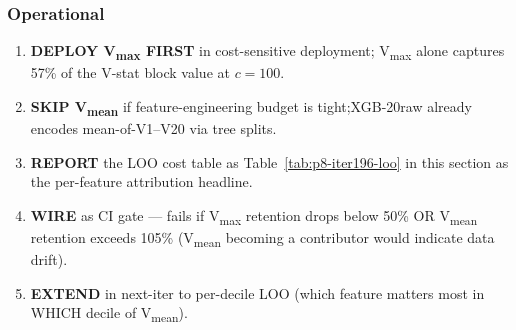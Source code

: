 \subsubsection{Operational}\label{sec:p8-iter196-operational}
\begin{enumerate}
\item \textbf{DEPLOY V\textsubscript{max} FIRST} in cost-sensitive deployment;
  V\textsubscript{max} alone captures 57\% of the V-stat block value at $c{=}100$.
\item \textbf{SKIP V\textsubscript{mean}} if feature-engineering budget is
  tight;XGB-20raw already encodes mean-of-V1--V20 via tree splits.
\item \textbf{REPORT} the LOO cost table as Table~\ref{tab:p8-iter196-loo}
  in this section as the per-feature attribution headline.
\item \textbf{WIRE} as CI gate --- fails if V\textsubscript{max} retention
  drops below 50\% OR V\textsubscript{mean} retention exceeds 105\%
  (V\textsubscript{mean} becoming a contributor would indicate data drift).
\item \textbf{EXTEND} in next-iter to per-decile LOO (which feature matters
  most in WHICH decile of V\textsubscript{mean}).
\end{enumerate}